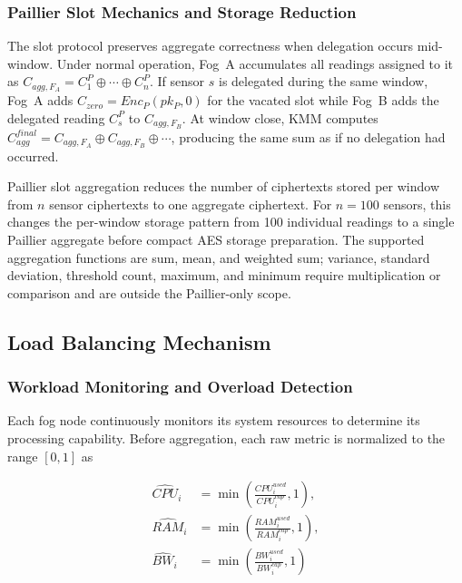 \documentclass[conference]{IEEEtran}
\begin{document}
    \subsubsection{\textbf{Paillier Slot Mechanics and Storage Reduction}}

    The slot protocol preserves aggregate correctness when delegation occurs mid-window. Under normal operation, Fog~A accumulates all readings assigned to it as $C_{agg,F_A}=C_1^P\oplus\cdots\oplus C_n^P$. If sensor $s$ is delegated during the same window, Fog~A adds $C_{zero}=Enc_P(pk_P,0)$ for the vacated slot while Fog~B adds the delegated reading $C_s^P$ to $C_{agg,F_B}$. At window close, KMM computes $C_{agg}^{final}=C_{agg,F_A}\oplus C_{agg,F_B}\oplus\cdots$, producing the same sum as if no delegation had occurred.

    Paillier slot aggregation reduces the number of ciphertexts stored per window from $n$ sensor ciphertexts to one aggregate ciphertext. For $n=100$ sensors, this changes the per-window storage pattern from 100 individual readings to a single Paillier aggregate before compact AES storage preparation. The supported aggregation functions are sum, mean, and weighted sum; variance, standard deviation, threshold count, maximum, and minimum require multiplication or comparison and are outside the Paillier-only scope.


    \subsection{Load Balancing Mechanism}
    \label{sec:lb}
    \subsubsection{Workload Monitoring and Overload Detection}

    Each fog node continuously monitors its system resources to determine its processing capability. Before aggregation, each raw metric is normalized to the range $[0,1]$ as

    \begin{equation}
    \begin{aligned}
    \widehat{CPU}_i &= \min\!\left(\frac{CPU_i^{used}}{CPU_i^{cap}},1\right),\\
    \widehat{RAM}_i &= \min\!\left(\frac{RAM_i^{used}}{RAM_i^{cap}},1\right),\\
    \widehat{BW}_i &= \min\!\left(\frac{BW_i^{used}}{BW_i^{cap}},1\right)
    \end{aligned}
    \end{equation}
\end{document}
